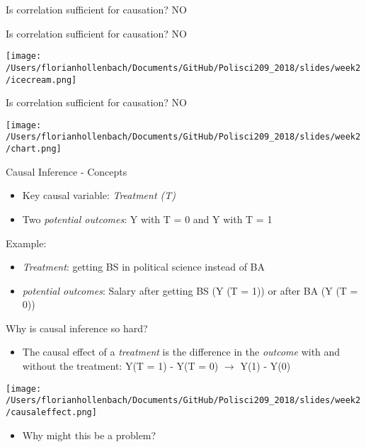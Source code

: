 \documentclass[presentation]{beamer}
\begin{document}
\begin{frame}[label={sec:orgc600b38}]{Is correlation sufficient for causation?}
\pause
\LARGE{NO}
\end{frame}

\begin{frame}[label={sec:orgd8c83f5}]{Is correlation sufficient for causation?}
\LARGE{NO}

\begin{center}
\texttt{[image: /Users/florianhollenbach/Documents/GitHub/Polisci209\_2018/slides/week2/icecream.png]}
\end{center}
\end{frame}


\begin{frame}[label={sec:org3e7a1b2}]{Is correlation sufficient for causation?}
\LARGE{NO}

\begin{center}
\texttt{[image: /Users/florianhollenbach/Documents/GitHub/Polisci209\_2018/slides/week2/chart.png]}
\end{center}
\end{frame}



\begin{frame}[label={sec:orga007578}]{Causal Inference - Concepts}
\begin{itemize}
\item Key causal variable: \emph{Treatment (T)}
\item Two \emph{potential outcomes}: Y with T = 0 and Y with T = 1
\end{itemize}

\pause
Example:
\begin{itemize}
\item \emph{Treatment}: getting BS in political science instead of BA
\item \emph{potential outcomes}: Salary after getting BS (Y (T = 1)) or after BA (Y (T = 0))
\end{itemize}
\end{frame}


\begin{frame}[label={sec:org0dcf749}]{Why is causal inference so hard?}
\begin{itemize}
\item The causal effect of a \emph{treatment} is the difference in the \emph{outcome} with and without the treatment:
Y(T = 1) - Y(T = 0) \(\rightarrow\) Y(1) - Y(0)
\end{itemize}

\pause
\begin{center}
\texttt{[image: /Users/florianhollenbach/Documents/GitHub/Polisci209\_2018/slides/week2/causaleffect.png]}
\end{center}

\begin{itemize}
\item Why might this be a problem?
\end{itemize}
\end{frame}
\end{document}
